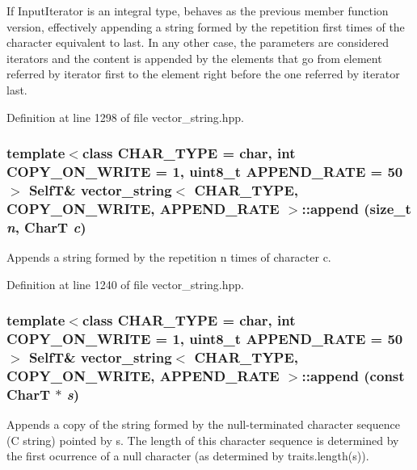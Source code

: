 If InputIterator is an integral type, behaves as the previous member function version, effectively appending a string formed by the repetition first times of the character equivalent to last. In any other case, the parameters are considered iterators and the content is appended by the elements that go from element referred by iterator first to the element right before the one referred by iterator last. 

Definition at line 1298 of file vector\_\-string.hpp.\hypertarget{classvector__string_5ba69172d97507ef4ad47a175cfe2d57}{
\subsubsection[{append}]{\setlength{\rightskip}{0pt plus 5cm}template$<$class CHAR\_\-TYPE  = char, int COPY\_\-ON\_\-WRITE = 1, uint8\_\-t APPEND\_\-RATE = 50$>$ {\bf SelfT}\& {\bf vector\_\-string}$<$ CHAR\_\-TYPE, COPY\_\-ON\_\-WRITE, APPEND\_\-RATE $>$::append (size\_\-t {\em n}, \/  CharT {\em c})}}
\label{classvector__string_5ba69172d97507ef4ad47a175cfe2d57}


Appends a string formed by the repetition n times of character c. 

Definition at line 1240 of file vector\_\-string.hpp.\hypertarget{classvector__string_151eff60f6b36bfe2d0c964017ef64b9}{
\subsubsection[{append}]{\setlength{\rightskip}{0pt plus 5cm}template$<$class CHAR\_\-TYPE  = char, int COPY\_\-ON\_\-WRITE = 1, uint8\_\-t APPEND\_\-RATE = 50$>$ {\bf SelfT}\& {\bf vector\_\-string}$<$ CHAR\_\-TYPE, COPY\_\-ON\_\-WRITE, APPEND\_\-RATE $>$::append (const CharT $\ast$ {\em s})}}
\label{classvector__string_151eff60f6b36bfe2d0c964017ef64b9}


Appends a copy of the string formed by the null-terminated character sequence (C string) pointed by s. The length of this character sequence is determined by the first ocurrence of a null character (as determined by traits.length(s)). 

